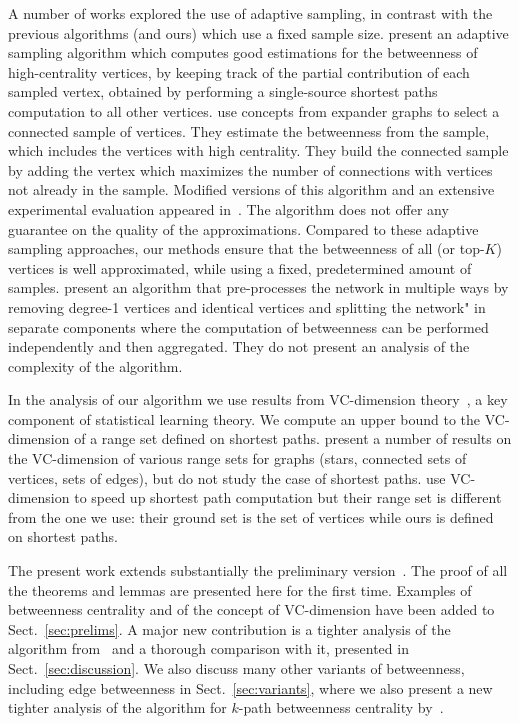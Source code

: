 A number of works explored
the use of adaptive sampling, in contrast with the previous algorithms (and
ours) which use a fixed sample size. \citet{BaderKMM07} present an adaptive
sampling algorithm which computes good estimations for the betweenness of
high-centrality vertices, by keeping track of the partial contribution of each
sampled vertex, obtained by performing a single-source shortest paths
computation to all other vertices. \citet{MaiyaBW10} use concepts from expander
graphs to select a connected sample of vertices. They estimate the betweenness
from the sample, which includes the vertices with high centrality. They build
the connected sample by adding the vertex which maximizes the number of
connections with vertices not already in the sample. Modified versions
of this algorithm and an extensive experimental evaluation appeared
in~\citep{LimMRTB11}. The algorithm does not offer any guarantee on the quality
of the approximations. Compared to these adaptive sampling approaches, our
methods ensure that the betweenness of all (or top-$K$) vertices is well
approximated, while using a fixed, predetermined amount of samples.
\citet{SaryuceSKC13} present an algorithm that pre-processes the network in
multiple ways by removing degree-1 vertices and identical vertices and splitting
the network" in separate components where the computation of betweenness can be
performed independently and then aggregated. They do not present an analysis of
the complexity of the algorithm. 

In the analysis of our algorithm we use results from VC-dimension
theory~\citep{VapnikC71}, a key component of statistical learning theory. We
compute an upper bound to the VC-dimension of a range set defined on shortest
paths. \citet{KranakisKRUW97} present a number of results on the VC-dimension of
various range sets for graphs (stars, connected sets of vertices, sets of
edges), but do not study the case of shortest paths. \citet{AbrahamDFGW11} use
VC-dimension to speed up shortest path computation but their range set is
different from the one we use: their ground set is the set of vertices while
ours is defined on shortest paths.

\ifproof
The present work extends substantially the preliminary
version~\citep{RiondatoK14WSDM}. The proof of all the theorems and lemmas are
presented here for the first time. Examples of betweenness centrality and of the
concept of VC-dimension have been added to Sect.~\ref{sec:prelims}. A major new
contribution is a tighter analysis of the algorithm from~\citep{BrandesP07} and
a thorough comparison with it, presented in Sect.~\ref{sec:discussion}. We also
discuss many other variants of betweenness, including edge betweenness in
Sect.~\ref{sec:variants}, where we also present a new tighter analysis of the
algorithm for $k$-path betweenness centrality by~\citep{KourtellisASIT12}.  %
\fi


